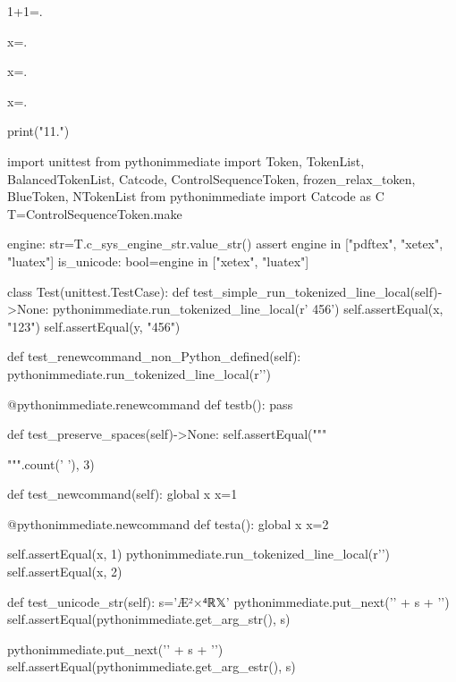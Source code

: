 \documentclass[a5paper]{article}
\begin{document}
1+1=.


x=.


x=.  %

x=.  %

\begin{pycode}
print("11.\n")
\end{pycode}

\begin{pycode}
\end{pycode}


\begin{pycode}


import unittest
from pythonimmediate import Token, TokenList, BalancedTokenList, Catcode, ControlSequenceToken, frozen_relax_token, BlueToken, NTokenList
from pythonimmediate import Catcode as C
T=ControlSequenceToken.make

engine: str=T.c_sys_engine_str.value_str()
assert engine in ["pdftex", "xetex", "luatex"]
is_unicode: bool=engine in ["xetex", "luatex"]

class Test(unittest.TestCase):
	def test_simple_run_tokenized_line_local(self)->None:
		pythonimmediate.run_tokenized_line_local(r' {456}')
		self.assertEqual(x, "123")
		self.assertEqual(y, "456")

	def test_renewcommand_non_Python_defined(self):
		pythonimmediate.run_tokenized_line_local(r'\def \testb {}')

		@pythonimmediate.renewcommand
		def testb(): pass


	def test_preserve_spaces(self)->None:
		self.assertEqual("""
   
""".count(' '), 3)

	def test_newcommand(self):
		global x
		x=1

		@pythonimmediate.newcommand
		def testa():
			global x
			x=2

		self.assertEqual(x, 1)
		pythonimmediate.run_tokenized_line_local(r'\testa')
		self.assertEqual(x, 2)

	def test_unicode_str(self):
		s='Æ²×⁴ℝ𝕏'
		pythonimmediate.put_next('{' + s + '}')
		self.assertEqual(pythonimmediate.get_arg_str(), s)

		pythonimmediate.put_next('{' + s + '}')
		self.assertEqual(pythonimmediate.get_arg_estr(), s)


\end{pycode}
\end{document}
